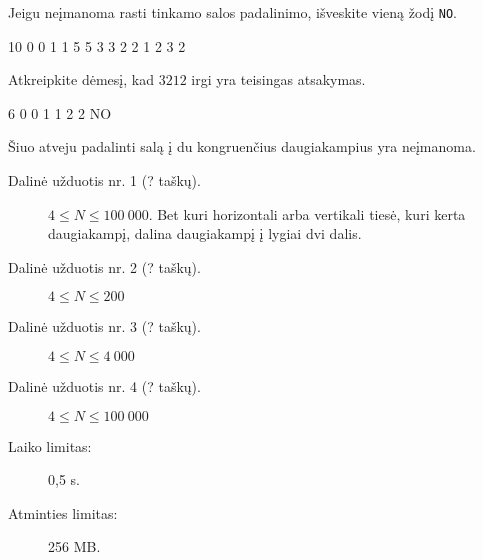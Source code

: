 \documentclass{boi2014-lt}
\newcommand{\constant}[1]{{\tt #1}}
\begin{document}
    Jeigu neįmanoma rasti tinkamo salos padalinimo, išveskite vieną žodį
    \constant{NO}.
    
    \pagebreak

    \Examples
	\example
	{
		10  0  0  1  1  5  5  3  3  2  2
	}
	{
		1 2 3 2
	}
	{
		Atkreipkite dėmesį, kad $3 2 1 2$ irgi yra teisingas atsakymas.
		
        \begin{center}
        \end{center}
	}

	\example
	{
		6  0  0  1  1  2  2
	}
	{
		NO
	}
	{
        Šiuo atveju padalinti salą į du kongruenčius daugiakampius yra neįmanoma.
        \begin{center}
        \end{center}
	}

    \Scoring

    \begin{description}
        \item[Dalinė užduotis nr. 1 (? taškų).] $4 \le N \le 100\ 000$.
            Bet kuri horizontali arba vertikali tiesė, kuri kerta daugiakampį,
            dalina daugiakampį į lygiai dvi dalis.
        \item[Dalinė užduotis nr. 2 (? taškų).] $4 \le N \le 200$
        \item[Dalinė užduotis nr. 3 (? taškų).] $4 \le N \le 4\ 000$
        \item[Dalinė užduotis nr. 4 (? taškų).] $4 \le N \le 100\ 000$
    \end{description}

    \Constraints

    \begin{description}
        \item[Laiko limitas:] 0,5 s.
        \item[Atminties limitas:] 256 MB.
    \end{description}
\end{document}
